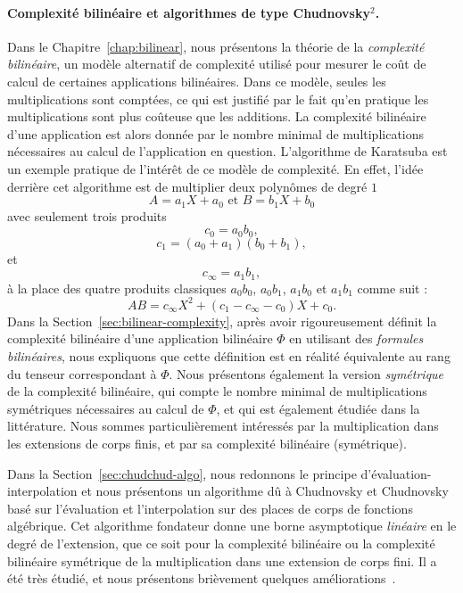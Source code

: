 \paragraph{Complexité bilinéaire et algorithmes de type Chudnovsky$^2$.} Dans le
Chapitre~\ref{chap:bilinear}, nous présentons la théorie de la \emph{complexité
bilinéaire}, un modèle alternatif de complexité utilisé pour mesurer le coût de
calcul de certaines applications bilinéaires. Dans ce modèle, seules les
multiplications sont comptées, ce qui est justifié par le fait qu'en pratique
les multiplications sont plus coûteuse que les additions. La complexité
bilinéaire d'une application est alors donnée par le nombre minimal de
multiplications nécessaires au calcul de l'application en question. L'algorithme
de Karatsuba est un exemple pratique de l'intérêt de ce modèle de complexité. En
effet, l'idée derrière cet algorithme est de multiplier deux polynômes de degré
$1$
\[
  A = a_1 X + a_0\text{ et }B = b_1 X + b_0
\]
avec seulement trois produits
\[
  c_0 = a_0b_0,
\]
\[
  c_1 = (a_0+a_1)(b_0+b_1),
\]
et
\[
  c_\infty = a_1b_1,
\]
à la place des quatre produits classiques $a_0b_0$, $a_0b_1$, $a_1b_0$ et
$a_1b_1$ comme suit :
\[
  AB = c_\infty X^2 + (c_1-c_\infty-c_0) X + c_0.
\]
Dans la Section~\ref{sec:bilinear-complexity}, après avoir rigoureusement
définit la complexité bilinéaire d'une application bilinéaire $\Phi$ en
utilisant des \emph{formules bilinéaires}, nous expliquons que cette définition
est en réalité équivalente au rang du tenseur correspondant à $\Phi$. Nous
présentons également la version \emph{symétrique} de la complexité bilinéaire,
qui compte le nombre minimal de multiplications symétriques nécessaires au
calcul de $\Phi$, et qui est également étudiée dans la littérature. Nous sommes
particulièrement intéressés par la multiplication dans les extensions de corps
finis, et par sa complexité bilinéaire (symétrique).

Dans la Section~\ref{sec:chudchud-algo}, nous redonnons le principe
d'évaluation-interpolation et nous présentons un algorithme dû à Chudnovsky et
Chudnovsky~\cite{CC88} basé sur l'évaluation et l'interpolation sur des places
de corps de fonctions algébrique. Cet algorithme fondateur donne une borne
asymptotique \emph{linéaire} en le degré de l'extension, que ce soit pour la
complexité bilinéaire ou la complexité bilinéaire symétrique de la
multiplication dans une extension de corps fini. Il a été très étudié, et nous
présentons brièvement quelques améliorations~\cite{BR04, CO10, Randriam12}.


